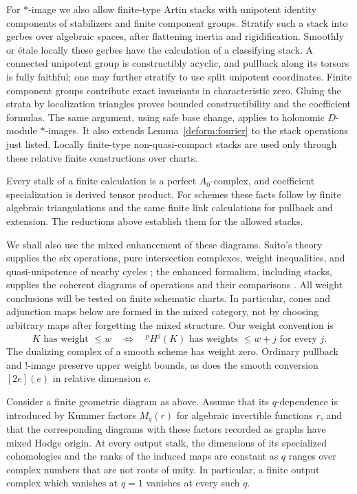 For $*$-image we also allow finite-type Artin stacks with unipotent
identity components of stabilizers and finite component groups.
Stratify such a stack into gerbes over algebraic spaces, after
flattening inertia and rigidification.  Smoothly or \'etale locally
these gerbes have the calculation of a classifying stack.  A
connected unipotent group is constructibly acyclic, and pullback
along its torsors is fully faithful; one may further stratify to
use split unipotent coordinates.  Finite component groups contribute
exact invariants in characteristic zero.  Gluing the strata by
localization triangles proves bounded constructibility and the
coefficient formulas.  The same argument, using safe base change,
applies to holonomic $D$-module $*$-images.  It also extends
Lemma~\ref{deform:fourier} to the stack operations just listed.
Locally finite-type non-quasi-compact stacks are used only through
these relative finite constructions over charts.

Every stalk of a finite calculation is a perfect $A_0$-complex, and
coefficient specialization is derived tensor product.  For schemes
these facts follow by finite algebraic triangulations and the same
finite link calculations for pullback and extension.  The reductions
above establish them for the allowed stacks.

We shall also use the mixed enhancement of these diagrams.  Saito's
theory supplies the six operations, pure intersection complexes,
weight inequalities, and quasi-unipotence of nearby cycles
\cite{SaitoMHM}; the enhanced formalism, including stacks, supplies
the coherent diagrams of operations and their comparisons
\cite[Sections~1 and~3]{TubachMHM}.  All weight conclusions will be
tested on finite schematic charts.  In particular, cones and
adjunction maps below are formed in the mixed category, not by
choosing arbitrary maps after forgetting the mixed structure.
Our weight convention is
\[
 K\text{ has weight }\le w
 \quad\Longleftrightarrow\quad
 {}^pH^j(K)\text{ has weights }\le w+j\text{ for every }j.
\]
The dualizing complex of a smooth scheme has weight zero.
Ordinary pullback and $!$-image preserve upper weight bounds, as does
the smooth conversion $[2e](e)$ in relative dimension $e$.

\begin{lemma}\label{deform:rank}
Consider a finite geometric diagram as above.  Assume that its
$q$-dependence is introduced by Kummer factors $M_q(r)$ for algebraic
invertible functions $r$, and that the corresponding diagrams with
these factors recorded as graphs have mixed Hodge origin.  At every
output stalk, the dimensions of its specialized cohomologies and
the ranks of the induced maps are constant as $q$ ranges over
complex numbers that are not roots of unity.  In particular, a
finite output complex which vanishes at $q=1$ vanishes at every such
$q$.
\end{lemma}

